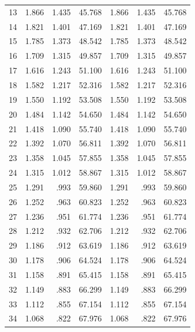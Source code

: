 \documentclass[review,3p,times,12pt,number]{elsarticle}
\begin{document}
\begin{table}[htbp]
\begin{tabular}{rrrrrrr}
    \multicolumn{1}{l}{13} & 1.866 & 1.435 & 45.768 & 1.866 & 1.435 & 45.768 \\
    \multicolumn{1}{l}{14} & 1.821 & 1.401 & 47.169 & 1.821 & 1.401 & 47.169 \\
    \multicolumn{1}{l}{15} & 1.785 & 1.373 & 48.542 & 1.785 & 1.373 & 48.542 \\
    \multicolumn{1}{l}{16} & 1.709 & 1.315 & 49.857 & 1.709 & 1.315 & 49.857 \\
    \multicolumn{1}{l}{17} & 1.616 & 1.243 & 51.100 & 1.616 & 1.243 & 51.100 \\
    \multicolumn{1}{l}{18} & 1.582 & 1.217 & 52.316 & 1.582 & 1.217 & 52.316 \\
    \multicolumn{1}{l}{19} & 1.550 & 1.192 & 53.508 & 1.550 & 1.192 & 53.508 \\
    \multicolumn{1}{l}{20} & 1.484 & 1.142 & 54.650 & 1.484 & 1.142 & 54.650 \\
    \multicolumn{1}{l}{21} & 1.418 & 1.090 & 55.740 & 1.418 & 1.090 & 55.740 \\
    \multicolumn{1}{l}{22} & 1.392 & 1.070 & 56.811 & 1.392 & 1.070 & 56.811 \\
    \multicolumn{1}{l}{23} & 1.358 & 1.045 & 57.855 & 1.358 & 1.045 & 57.855 \\
    \multicolumn{1}{l}{24} & 1.315 & 1.012 & 58.867 & 1.315 & 1.012 & 58.867 \\
    \multicolumn{1}{l}{25} & 1.291 & .993  & 59.860 & 1.291 & .993  & 59.860 \\
    \multicolumn{1}{l}{26} & 1.252 & .963  & 60.823 & 1.252 & .963  & 60.823 \\
    \multicolumn{1}{l}{27} & 1.236 & .951  & 61.774 & 1.236 & .951  & 61.774 \\
    \multicolumn{1}{l}{28} & 1.212 & .932  & 62.706 & 1.212 & .932  & 62.706 \\
    \multicolumn{1}{l}{29} & 1.186 & .912  & 63.619 & 1.186 & .912  & 63.619 \\
    \multicolumn{1}{l}{30} & 1.178 & .906  & 64.524 & 1.178 & .906  & 64.524 \\
    \multicolumn{1}{l}{31} & 1.158 & .891  & 65.415 & 1.158 & .891  & 65.415 \\
    \multicolumn{1}{l}{32} & 1.149 & .883  & 66.299 & 1.149 & .883  & 66.299 \\
    \multicolumn{1}{l}{33} & 1.112 & .855  & 67.154 & 1.112 & .855  & 67.154 \\
    \multicolumn{1}{l}{34} & 1.068 & .822  & 67.976 & 1.068 & .822  & 67.976 \\

\end{tabular}
\end{table}
\end{document}
